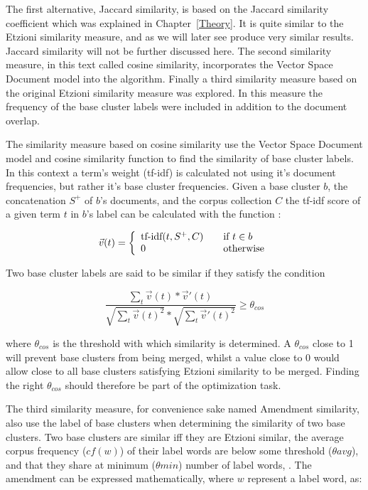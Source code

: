 The first alternative, Jaccard similarity, is based on the Jaccard similarity coefficient which was explained in Chapter~\ref{Theory}. It is quite similar to the Etzioni similarity measure, and as we will later see produce very similar results. Jaccard similarity will not be further discussed here. The second similarity measure, in this text called cosine similarity, incorporates the Vector Space Document model into the \CTC algorithm. Finally a third similarity measure based on the original Etzioni similarity measure was explored. In this measure the frequency of the base cluster labels were included in addition to the document overlap.

The similarity measure based on cosine similarity use the Vector Space Document model and cosine similarity function to find the similarity of base cluster labels. In this context a term's weight (tf-idf) is calculated not using it's document frequencies, but rather it's base cluster frequencies. Given a base cluster \(b\), the concatenation \(S^+\) of \(b\)'s documents, and the corpus collection \(C\) the tf-idf score of a given term \(t\) in \(b\)'s label can be calculated with the function \parencite{Moe2014}:

\begin{displaymath}
\vec{v}(t) = \left\{
  \begin{array}{l l}
    \text{tf-idf}(t, S^+, C) & \quad \text{if $t \in b$}\\
    0 & \quad \text{otherwise}
  \end{array} \right.
\end{displaymath}

Two base cluster labels are said to be similar if they satisfy the condition

\begin{displaymath}
\frac{\sum_{t}\vec{v}(t) * \vec{v}'(t)}
{\sqrt{\sum_{t}\vec{v}(t)^2} * \sqrt{\sum_{t}\vec{v}'(t)^2}}
\ge \theta_{cos}
\end{displaymath}

where \(\theta_{cos}\) is the threshold with which similarity is determined. A \(\theta_{cos}\) close to 1 will prevent base clusters from being merged, whilst a value close to 0 would allow close to all base clusters satisfying Etzioni similarity to be merged. Finding the right \(\theta_{cos}\) should therefore be part of the optimization task.

The third similarity measure, for convenience sake named Amendment similarity, also use the label of base clusters when determining the similarity of two base clusters. Two base clusters are similar iff they are Etzioni similar, the average corpus frequency (\(cf(w)\)) of their label words are below some threshold (\(\theta avg\)), and that they share at minimum (\(\theta min\)) number of label words, \parencite{Moe2014}. The amendment can be expressed mathematically, where \(w\) represent a label word, as:

